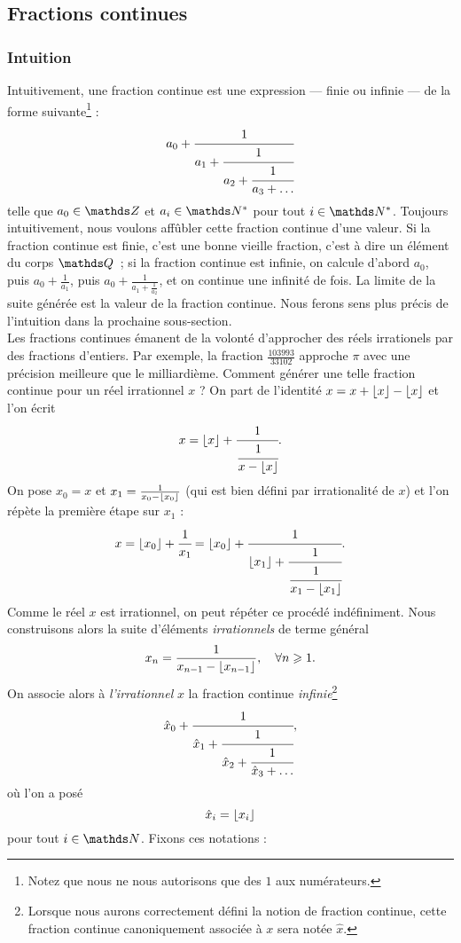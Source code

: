 \subsection{Fractions continues}
\subsubsection{Intuition}

Intuitivement, une fraction continue est une expression — finie ou infinie — de
la forme suivante\footnote{Notez que nous ne nous autorisons que des $1$ aux
numérateurs.} : \[a_0 + \cfrac{1}{a_1 + \cfrac{1}{a_2 + \cfrac{1}{a_3 +
\dots}}}\] telle que $a_0\in \Z$ et $a_i \in \N^*$ pour tout $i\in \N^*$.
Toujours intuitivement, nous voulons affûbler cette fraction continue d'une
valeur. Si la fraction continue est finie, c'est une bonne vieille fraction,
c'est à dire un élément du corps $\Q$~; si la fraction continue est infinie, on
calcule d'abord $a_0$, puis $a_0 + \frac{1}{a_1}$, puis $a_0 + \frac{1}{a_1
+\frac{1}{a_2}}$, et on continue une infinité de fois. La limite de la suite
générée est la \og{} valeur \fg{} de la fraction continue. Nous ferons sens
plus précis de l'intuition dans la prochaine sous-section. \\

Les fractions continues émanent de la volonté d'approcher des réels irrationels
par des fractions d'entiers. Par exemple, la fraction $\frac{103 993}{33 102}$
approche $\pi$ avec une précision meilleure que le milliardième.  Comment
générer une telle fraction continue pour un réel irrationnel $x$ ?  On part de
l'identité $x = x + \lfloor x\rfloor - \lfloor x\rfloor$ et l'on écrit \[x = \lfloor x\rfloor +
\cfrac{1}{\cfrac{1}{x - \lfloor x\rfloor}}.\] On pose $x_0 = x$ et $x_1 = \frac{1}{x_0 -
\lfloor x_0\rfloor}$ (qui est bien défini par irrationalité de $x$) et l'on répète la
première étape sur $x_1$ : \[x = \lfloor x_0\rfloor + \cfrac{1}{x_1} = \lfloor x_0\rfloor +
\cfrac{1}{\lfloor x_1\rfloor + \cfrac{1}{\cfrac{1}{x_1 - \lfloor x_1\rfloor}}}.\] Comme le réel
$x$ est irrationnel, on peut répéter ce procédé indéfiniment. Nous construisons
alors la suite d'éléments \emph{irrationnels} de terme général \[x_n =
\frac{1}{x_{n-1} - \lfloor x_{n-1}\rfloor}, \quad \forall n \geqslant 1.\] On associe alors à
\emph{l'irrationnel} $x$ la fraction continue \emph{infinie}\footnote{Lorsque
nous aurons correctement défini la notion de fraction continue, cette fraction
continue canoniquement associée à $x$ sera notée $\hat{x}$.} \[\hat{x}_0 +
\cfrac{1}{\hat{x}_1 + \cfrac{1}{\hat{x}_2 + \cfrac{1}{\hat{x}_3 + \dots}}},\]
où l'on a posé \[\hat{x}_i = \lfloor x_i\rfloor\] pour tout $i\in \N$. Fixons ces
notations :

